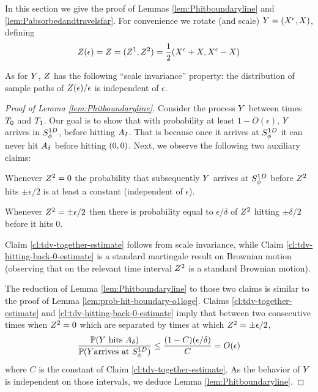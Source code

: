 {
{
\newcommand{\x}{\resamplede}
\newcommand{\y}{\sampled}
In this section we give the proof of Lemmas \ref{lem:Phitboundaryline} and
\ref{lem:Pabsorbedandtravelsfar}. For convenience we rotate (and scale)
$\twodim=(\x,\y)$, defining
\[\rotproc(\epsilon) = \rotproc=(\tdh,\tdv)=\frac{1}{2}(\x+\y,\x-\y)\]

As for $Y$, $Z$ has the following ``scale invariance''
property: the distribution of sample paths of $Z(\epsilon) /
\epsilon$ is independent of $\epsilon$.

\begin{proof}[Proof of Lemma \ref{lem:Phitboundaryline}]
Consider the process $Y$ between times $T_0$ and
$T_1$. Our goal is to show that with probability at least
$1-O(\epsilon)$, $Y$ arrives in $S^{1D}_{\phi}$, before hitting
$A_\delta$. That is because once it arrives at $S^{1D}_{\phi}$ it
can never hit $A_\delta$ before hitting $(0,0)$. Next, we observe the
following two auxiliary claims:

\begin{claim}\label{cl:tdv-together-estimate}
  Whenever $Z^2=0$ the probability that subsequently $Y$
  arrives at $S^{1D}_{\phi}$ before $Z^2$ hits $\pm\epsilon/2$ is at
  least a constant (independent of $\epsilon$).
\end{claim}

\begin{claim}\label{cl:tdv-hitting-back-0-estimate}
  Whenever $Z^2=\pm\epsilon/2$ then there is probability equal to
  $\epsilon/\delta$ of $Z^2$ hitting $\pm\delta/2$ before it hits $0$.
\end{claim}

Claim \ref{cl:tdv-together-estimate} follows from scale invariance, while
Claim \ref{cl:tdv-hitting-back-0-estimate} is a standard martingale result on
Brownian motion (observing that on the relevant time interval $Z^2$ is a
standard Brownian motion).

The reduction of Lemma \ref{lem:Phitboundaryline} to those two claims is
similar to the proof of Lemma \ref{lem:prob-hit-boundary-o1loge}. Claims
\ref{cl:tdv-together-estimate} and \ref{cl:tdv-hitting-back-0-estimate} imply
that between two consecutive times when $Z^2=0$ which are separated
by times at which $Z^2 = \pm\epsilon/2$,
\[
\frac{\mathbb{P}(Y\text{ hits }A_\delta)}{\mathbb{P}(Y\text{arrives at }S^{1D}_{\phi})}
\le \frac{(1-C)(\epsilon/\delta)}{C} =O(\epsilon)
\]
where $C$ is the constant of Claim \ref{cl:tdv-together-estimate}. As the
behavior of $Y$ is independent on those intervals, we deduce Lemma
\ref{lem:Phitboundaryline}.


\end{proof}}}
